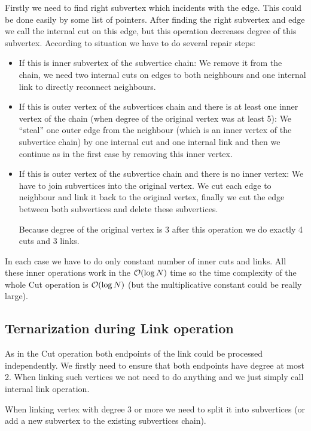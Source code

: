 Firstly we need to find right subvertex which incidents with the edge. This
could be done easily by some list of pointers. After finding the right subvertex
and edge we call the internal cut on this edge, but this operation decreases
degree of this subvertex. According to situation we have to do several repair
steps:

\begin{itemize}
\item {\I If this is inner subvertex of the subvertice chain:} We remove it
from the chain, we need two internal cuts on edges to both neighbours and one
internal link to directly reconnect neighbours.
\item {\I If this is outer vertex of the subvertices chain and there is at least
one inner vertex of the chain (when degree of the original vertex was
at least 5):} We ``steal'' one outer edge from the neighbour (which is
an inner vertex of the subvertice chain) by one internal cut and one internal
link and then we continue as in the first case by removing this inner vertex.
\item {\I If this is outer vertex of the subvertice chain and there is no inner
vertex:} We have to join subvertices into the original vertex. We cut each edge
to neighbour and link it back to the original vertex, finally we cut the edge
between both subvertices and delete these subvertices.

Because degree of the original vertex is 3 after this operation we do exactly
4 cuts and 3 links.
\end{itemize}

In each case we have to do only constant number of inner cuts and links. All
these inner operations work in the ${\cal O}(\log N)$ time so the time complexity of
the whole Cut operation is ${\cal O}(\log N)$ (but the multiplicative constant could
be really large).

\subsection{Ternarization during Link operation}

As in the Cut operation both endpoints of the link could be processed
independently. We firstly need to ensure that both endpoints have degree at
most 2. When linking such vertices we not need to do anything and we just simply
call internal link operation.

When linking vertex with degree 3 or more we need to split it into subvertices
(or add a new subvertex to the existing subvertices chain).

